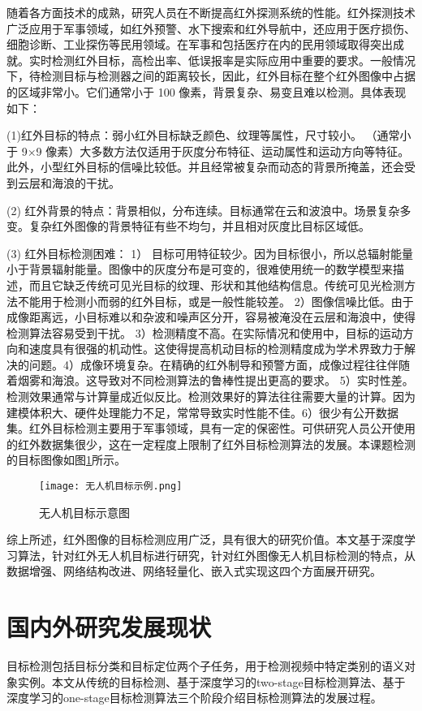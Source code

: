 随着各方面技术的成熟，研究人员在不断提高红外探测系统的性能。红外探测技术广泛应用于军事领域，如红外预警、水下搜索和红外导航中，还应用于医疗损伤、细胞诊断、工业探伤等民用领域。在军事和包括医疗在内的民用领域取得突出成就。实时检测红外目标，高检出率、低误报率是实际应用中重要的要求。一般情况下，待检测目标与检测器之间的距离较长，因此，红外目标在整个红外图像中占据的区域非常小。它们通常小于 100 像素，背景复杂、易变且难以检测。具体表现如下：

(1)红外目标的特点：弱小红外目标缺乏颜色、纹理等属性，尺寸较小。 （通常小于 9×9 像素）大多数方法仅适用于灰度分布特征、运动属性和运动方向等特征。此外，小型红外目标的信噪比较低。并且经常被复杂而动态的背景所掩盖，还会受到云层和海浪的干扰。

(2) 红外背景的特点：背景相似，分布连续。目标通常在云和波浪中。场景复杂多变。复杂红外图像的背景特征有些不均匀，并且相对灰度比目标区域低。

(3) 红外目标检测困难： 1） 目标可用特征较少。因为目标很小，所以总辐射能量小于背景辐射能量。图像中的灰度分布是可变的，很难使用统一的数学模型来描述，而且它缺乏传统可见光目标的纹理、形状和其他结构信息。传统可见光检测方法不能用于检测小而弱的红外目标，或是一般性能较差。 2）图像信噪比低。由于成像距离远，小目标难以和杂波和噪声区分开，容易被淹没在云层和海浪中，使得检测算法容易受到干扰。 3）检测精度不高。在实际情况和使用中，目标的运动方向和速度具有很强的机动性。这使得提高机动目标的检测精度成为学术界致力于解决的问题。4）成像环境复杂。在精确的红外制导和预警方面，成像过程往往伴随着烟雾和海浪。这导致对不同检测算法的鲁棒性提出更高的要求。 5）实时性差。检测效果通常与计算量成近似反比。检测效果好的算法往往需要大量的计算。因为建模体积大、硬件处理能力不足，常常导致实时性能不佳。6）很少有公开数据集。红外目标检测主要用于军事领域，具有一定的保密性。可供研究人员公开使用的红外数据集很少，这在一定程度上限制了红外目标检测算法的发展。本课题检测的目标图像如图\ref{uav}所示。

\begin{figure}[htbp]
    \centering
    \texttt{[image: 无人机目标示例.png]}
    \caption{无人机目标示意图}
    \label{uav}
\end{figure}

综上所述，红外图像的目标检测应用广泛，具有很大的研究价值。本文基于深度学习算法，针对红外无人机目标进行研究，针对红外图像无人机目标检测的特点，从数据增强、网络结构改进、网络轻量化、嵌入式实现这四个方面展开研究。

\section{国内外研究发展现状}
目标检测包括目标分类和目标定位两个子任务，用于检测视频中特定类别的语义对象实例。本文从传统的目标检测、基于深度学习的two-stage目标检测算法、基于深度学习的one-stage目标检测算法三个阶段介绍目标检测算法的发展过程\cite{尹宏鹏2016基于视觉的目标检测与跟踪综述}。

